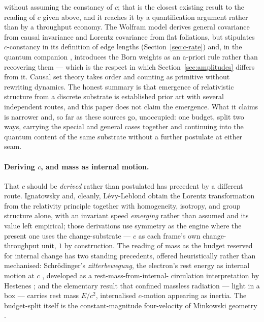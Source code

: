 \documentclass[11pt,a4paper]{article}
\theoremstyle{remark}\newtheorem{remark}[definition]{Remark}
\begin{document}
without assuming the constancy of $c$; that is the closest existing result to the reading of $c$
given above, and it reaches it by a quantification argument rather than by a throughput economy.
The Wolfram model \citep{wolfram2020,gorard2020rel} derives general covariance from causal
invariance and Lorentz covariance from flat foliations, but stipulates $c$-constancy in its
definition of edge lengths (Section~\ref{sec:c-rate}) and, in the quantum companion
\citep{gorard2020qm}, introduces the Born weights as an a-priori rule rather than recovering them
--- which is the respect in which Section~\ref{sec:amplitudes} differs from it. Causal set theory
\citep{bombelli1987,surya2019} takes order and counting as primitive without rewriting dynamics.
The honest summary is that emergence of relativistic structure from a discrete substrate is
established prior art with several independent routes, and this paper does not claim the emergence.
What it claims is narrower and, so far as these sources go, unoccupied: one budget, split two ways,
carrying the special and general cases together and continuing into the quantum content of the same
substrate without a further postulate at either seam.

\paragraph{Deriving $c$, and mass as internal motion.} That $c$ should be
\emph{derived} rather than postulated has precedent by a different route.
Ignatowsky \citep{ignatowsky1910} and, cleanly, L\'evy-Leblond
\citep{levyleblond1976} obtain the Lorentz transformation from the relativity
principle together with homogeneity, isotropy, and group structure alone, with an
invariant speed \emph{emerging} rather than assumed and its value left empirical;
those derivations use symmetry as the engine where the present one uses the
change-substrate --- $c$ as each frame's own change-throughput unit, $1$ by
construction. The reading of mass as the budget reserved for internal change has
two standing precedents, offered heuristically rather than mechanised:
Schr\"odinger's \emph{zitterbewegung}, the electron's rest energy as internal
motion at $c$ \citep{schrodinger1930}, developed as a rest-mass-from-internal-
circulation interpretation by Hestenes \citep{hestenes1990}; and the elementary
result that confined massless radiation --- light in a box --- carries rest mass
$E/c^{2}$, internalised $c$-motion appearing as inertia. The budget-split itself
is the constant-magnitude four-velocity of Minkowski geometry
\citep{minkowski1908}.
\end{document}
